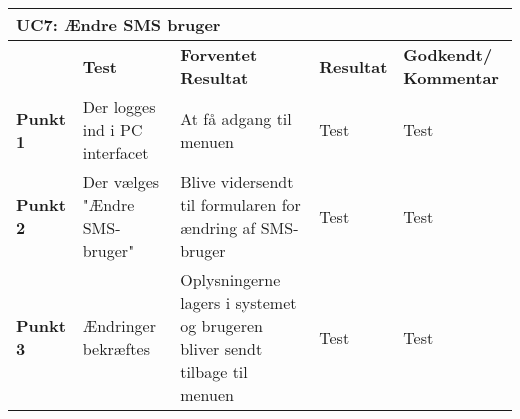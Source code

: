 \begin{table}[htbp] \centering
\begin{tabular}{|p{}|p{}|p{3cm}|p{3cm}|p{3cm}|} %
	\hline
\multicolumn{5}{|l|}{\textbf{UC7: Ændre SMS bruger}} \\\hline
&\textbf{Test} &\textbf{Forventet \newline Resultat} &\textbf{Resultat} &\textbf{Godkendt/ \newline Kommentar} \\\hline
\textbf{Punkt 1}		&Der logges ind i PC interfacet	&At få adgang til menuen 	&Test	&Test \\\hline
\textbf{Punkt 2}		&Der vælges "Ændre SMS-bruger"	&Blive vidersendt til formularen for ændring af SMS-bruger 	&Test	&Test \\\hline
\textbf{Punkt 3}		&Ændringer bekræftes				&Oplysningerne lagers i systemet og brugeren bliver sendt tilbage til menuen 	&Test	&Test \\\hline
	\end{tabular}
	\label{ATUC7} 
\end{table}